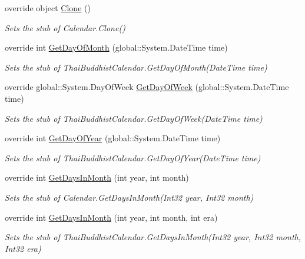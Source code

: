 \begin{DoxyCompactItemize}
override object \hyperlink{class_system_1_1_globalization_1_1_fakes_1_1_stub_thai_buddhist_calendar_aeddce2b2fdabdb5d1c6b31620fbc020e}{Clone} ()
\begin{DoxyCompactList}\small\item\em Sets the stub of Calendar.\-Clone()\end{DoxyCompactList}\item 
override int \hyperlink{class_system_1_1_globalization_1_1_fakes_1_1_stub_thai_buddhist_calendar_a5d414ed3181ffdff6432538996f242e4}{Get\-Day\-Of\-Month} (global\-::\-System.\-Date\-Time time)
\begin{DoxyCompactList}\small\item\em Sets the stub of Thai\-Buddhist\-Calendar.\-Get\-Day\-Of\-Month(\-Date\-Time time)\end{DoxyCompactList}\item 
override global\-::\-System.\-Day\-Of\-Week \hyperlink{class_system_1_1_globalization_1_1_fakes_1_1_stub_thai_buddhist_calendar_a1adf2b119348e4aaf025dcb9eedb49ac}{Get\-Day\-Of\-Week} (global\-::\-System.\-Date\-Time time)
\begin{DoxyCompactList}\small\item\em Sets the stub of Thai\-Buddhist\-Calendar.\-Get\-Day\-Of\-Week(\-Date\-Time time)\end{DoxyCompactList}\item 
override int \hyperlink{class_system_1_1_globalization_1_1_fakes_1_1_stub_thai_buddhist_calendar_a179f8e31eba7c29f5ab090fd65ea6a15}{Get\-Day\-Of\-Year} (global\-::\-System.\-Date\-Time time)
\begin{DoxyCompactList}\small\item\em Sets the stub of Thai\-Buddhist\-Calendar.\-Get\-Day\-Of\-Year(\-Date\-Time time)\end{DoxyCompactList}\item 
override int \hyperlink{class_system_1_1_globalization_1_1_fakes_1_1_stub_thai_buddhist_calendar_ac24f3b2fabf0e9551d6a8d3dcf9e8f6e}{Get\-Days\-In\-Month} (int year, int month)
\begin{DoxyCompactList}\small\item\em Sets the stub of Calendar.\-Get\-Days\-In\-Month(\-Int32 year, Int32 month)\end{DoxyCompactList}\item 
override int \hyperlink{class_system_1_1_globalization_1_1_fakes_1_1_stub_thai_buddhist_calendar_aa8e90b0395dd58b6ceb577014b5eacc9}{Get\-Days\-In\-Month} (int year, int month, int era)
\begin{DoxyCompactList}\small\item\em Sets the stub of Thai\-Buddhist\-Calendar.\-Get\-Days\-In\-Month(\-Int32 year, Int32 month, Int32 era)\end{DoxyCompactList}\item 

\end{DoxyCompactItemize}
